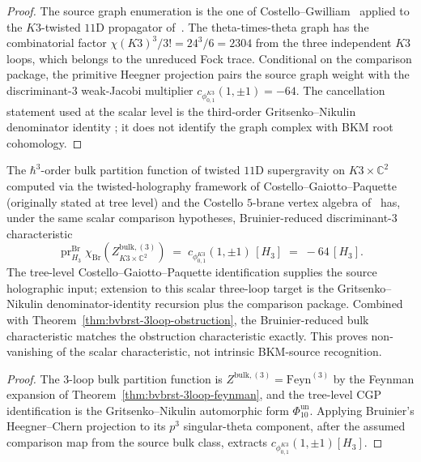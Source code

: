 \begin{proof}
The source graph enumeration is the one of
Costello--Gwilliam~\cite[Ch.~10, Vol.~1]{CostelloGwilliam2017} applied
to the $K3$-twisted $11$D propagator of~\cite[\S 3]{Costello2015omega}.
The theta-times-theta graph has the combinatorial factor
$\chi(K3)^3/3! = 24^3/6 = 2304$ from the three independent $K3$ loops,
which belongs to the unreduced Fock trace. Conditional on the
comparison package, the primitive Heegner projection pairs the source
graph weight with the discriminant-$3$ weak-Jacobi multiplier
\(c_{\phi_{0,1}^{K3}}(1,\pm1)=-64\). The cancellation statement used at the scalar
level is the third-order Gritsenko--Nikulin denominator identity
\cite[Thm.~1.2]{GritsenkoNikulin1998}; it does not identify the graph
complex with BKM root cohomology.
\end{proof}

\begin{corollary}
\label{cor:bvbrst-3loop-CGP-match}
The $\hbar^3$-order bulk partition function of twisted $11$D supergravity
on $K3\times\mathbb{C}^2$ computed via the twisted-holography framework
of Costello--Gaiotto--Paquette~\cite{CostelloGaiottoPaquette2018}
(originally stated at tree level) and the Costello $5$-brane vertex
algebra of~\cite{Costello2015omega} has, under the same scalar
comparison hypotheses, Bruinier-reduced discriminant-$3$ characteristic
\[
 \operatorname{pr}_{H_3}^{\mathrm{Br}}
 \chi_{\mathrm{Br}}\!\left(
 Z^{\mathrm{bulk},(3)}_{K3\times\mathbb{C}^2}
 \right)
 \;=\;
 c_{\phi_{0,1}^{K3}}(1,\pm1)\,[H_3]
 \;=\;
 -64\,[H_3].
\]
The tree-level Costello--Gaiotto--Paquette identification supplies the
source holographic input; extension to this scalar three-loop target is
the Gritsenko--Nikulin denominator-identity recursion plus the
comparison package.
Combined with Theorem~\ref{thm:bvbrst-3loop-obstruction}, the
Bruinier-reduced bulk characteristic matches the obstruction
characteristic exactly. This proves non-vanishing of the scalar
characteristic, not intrinsic BKM-source recognition.
\end{corollary}

\begin{proof}
The $3$-loop bulk partition function is
$Z^{\mathrm{bulk},(3)} = \mathrm{Feyn}^{(3)}$ by the Feynman expansion
of Theorem~\ref{thm:bvbrst-3loop-feynman}, and the tree-level CGP
identification is the Gritsenko--Nikulin automorphic form
$\Phi_{10}^{\mathrm{un}}$. Applying Bruinier's Heegner--Chern projection
to its $p^3$ singular-theta component, after the assumed comparison map
from the source bulk class, extracts
\(c_{\phi_{0,1}^{K3}}(1,\pm1)[H_3]\).
\end{proof}

